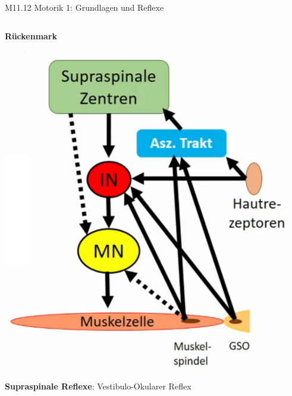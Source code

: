 \documentclass{beamer}
\begin{document}
\begin{frame}{M11.12 Motorik 1: Grundlagen und Reflexe} 


\begin{columns}[t]
\begin{column}{5cm}
\textbf{Rückenmark} \\

\begin{center}
    \includegraphics[width=\textwidth]{rueckenmark_orga.png}
\end{center}

\pause
\textbf{Supraspinale Reflexe}: Vestibulo-Okularer Reflex \\


\end{column}

\pause

\begin{column}{6cm}


\end{column}
\end{columns}
\end{frame}
\end{document}
